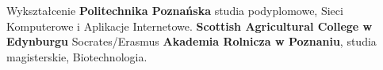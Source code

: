 \begin{rubric}{Wykształcenie}
\entry*[2010 -- 2011]\textbf{Politechnika Poznańska}
    studia podyplomowe,\newline
    Sieci Komputerowe i Aplikacje Internetowe.
\entry*[2005]\textbf{Scottish Agricultural College w Edynburgu}\newline
    Socrates/Erasmus
\entry*[2001 -- 2006]\textbf{Akademia Rolnicza w Poznaniu},
    studia magisterskie,\newline
    Biotechnologia.
\end{rubric}
